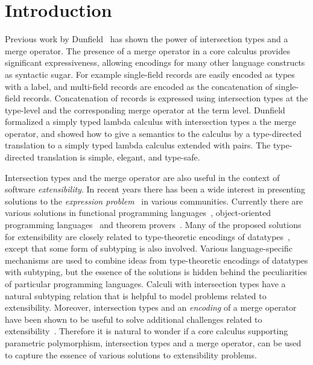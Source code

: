 \section{Introduction}

Previous work by Dunfield~\cite{dunfield2014elaborating} has shown the power of intersection
types and a merge operator. The presence of a merge operator in a core
calculus provides significant expressiveness, allowing encodings for many
other language constructs as syntactic sugar. For example single-field
records are easily encoded as types with a label, and multi-field
records are encoded as the concatenation of single-field
records. Concatenation of records is expressed using intersection
types at the type-level and the corresponding merge operator at the
term level. Dunfield formalized a simply typed lambda calculus with
intersection types a the merge operator, and showed how to give a
semantics to the calculus by a type-directed translation to a simply
typed lambda calculus extended with pairs. The type-directed
translation is simple, elegant, and type-safe.

Intersection types and the merge operator are also useful in the
context of software \emph{extensibility}. In recent years there has
been a wide interest in presenting solutions to the \emph{expression
  problem}~\cite{wadler1998expression} in various
communities. Currently there are various solutions in functional
programming languages~\cite{swierstra:la-carte,emgm}, object-oriented
programming
languages~\cite{togersen:2004,Zenger-Odersky2005,oliveira09modular,oliveira2012extensibility}
and theorem provers~\cite{DelawareOS13,SchwaabS13}.  
Many of the proposed solutions for extensibility are closely related
to type-theoretic encodings of datatypes~\cite{BoehmBerarducci},
except that some form of subtyping is also involved.  Various
language-specific mechanisms are used to combine ideas from
type-theoretic encodings of datatypes with subtyping, but the essence
of the solutions is hidden behind the peculiarities of particular
programming languages.  Calculi with intersection types have a natural
subtyping relation that is helpful to model problems related to
extensibility.  Moreover, intersection types and an \emph{encoding} of
a merge operator have been shown to be useful to solve additional
challenges related to extensibility~\cite{oliveira2013feature}.  
Therefore it is natural to wonder if a
core calculus supporting parametric polymorphism,
intersection types and a merge operator, can be used to capture the
essence of various solutions to extensibility problems.

